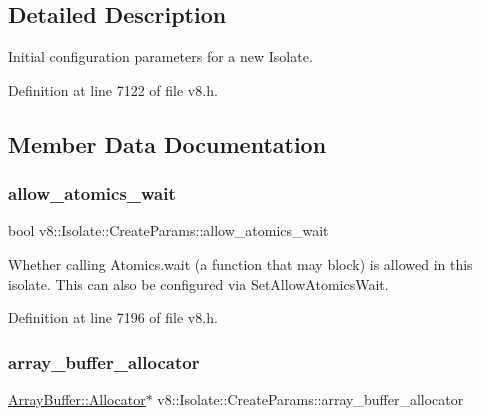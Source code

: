 \subsection{Detailed Description}
Initial configuration parameters for a new Isolate. 

Definition at line 7122 of file v8.\+h.



\subsection{Member Data Documentation}
\mbox{\label{structv8_1_1Isolate_1_1CreateParams_acade19de0f78ff15d76aaef2e292da72}} 
\subsubsection{\texorpdfstring{allow\+\_\+atomics\+\_\+wait}{allow\_atomics\_wait}}
{\footnotesize\ttfamily bool v8\+::\+Isolate\+::\+Create\+Params\+::allow\+\_\+atomics\+\_\+wait}

Whether calling Atomics.\+wait (a function that may block) is allowed in this isolate. This can also be configured via Set\+Allow\+Atomics\+Wait. 

Definition at line 7196 of file v8.\+h.

\mbox{\label{structv8_1_1Isolate_1_1CreateParams_a7c663f70b64290392eeaf164f57585f9}} 
\subsubsection{\texorpdfstring{array\+\_\+buffer\+\_\+allocator}{array\_buffer\_allocator}}
{\footnotesize\ttfamily \mbox{\hyperlink{classv8_1_1ArrayBuffer_1_1Allocator}{Array\+Buffer\+::\+Allocator}}$\ast$ v8\+::\+Isolate\+::\+Create\+Params\+::array\+\_\+buffer\+\_\+allocator}


